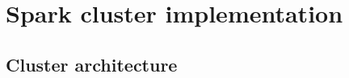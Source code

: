 \chapter{Spark cluster implementation}
\label{sec:spark_cluster}
%

\section{Cluster architecture}

